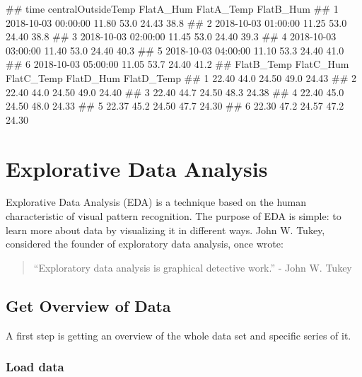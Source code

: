 \documentclass[
]{book}
\let\oldverbatim\verbatim
\let\endoldverbatim\endverbatim
\renewenvironment{verbatim}{\footnotesize\oldverbatim}{\endoldverbatim}
\begin{document}
\begin{verbatim}
##                  time centralOutsideTemp FlatA_Hum FlatA_Temp FlatB_Hum
## 1 2018-10-03 00:00:00              11.80      53.0      24.43      38.8
## 2 2018-10-03 01:00:00              11.25      53.0      24.40      38.8
## 3 2018-10-03 02:00:00              11.45      53.0      24.40      39.3
## 4 2018-10-03 03:00:00              11.40      53.0      24.40      40.3
## 5 2018-10-03 04:00:00              11.10      53.3      24.40      41.0
## 6 2018-10-03 05:00:00              11.05      53.7      24.40      41.2
##   FlatB_Temp FlatC_Hum FlatC_Temp FlatD_Hum FlatD_Temp
## 1      22.40      44.0      24.50      49.0      24.43
## 2      22.40      44.0      24.50      49.0      24.40
## 3      22.40      44.7      24.50      48.3      24.38
## 4      22.40      45.0      24.50      48.0      24.33
## 5      22.37      45.2      24.50      47.7      24.30
## 6      22.30      47.2      24.57      47.2      24.30
\end{verbatim}

\hypertarget{explorative-data-analysis}{%
\chapter{Explorative Data Analysis}\label{explorative-data-analysis}}

Explorative Data Analysis (EDA) is a technique based on the human characteristic of visual pattern recognition. The purpose of EDA is simple: to learn more about data by visualizing it in different ways. John W. Tukey, considered the founder of exploratory data analysis, once wrote:

\begin{quote}
``Exploratory data analysis is graphical detective work.'' - John W. Tukey
\end{quote}

\hypertarget{get-overview-of-data}{%
\section{Get Overview of Data}\label{get-overview-of-data}}

A first step is getting an overview of the whole data set and specific series of it.

\hypertarget{load-data}{%
\subsection{Load data}\label{load-data}}
\end{document}
